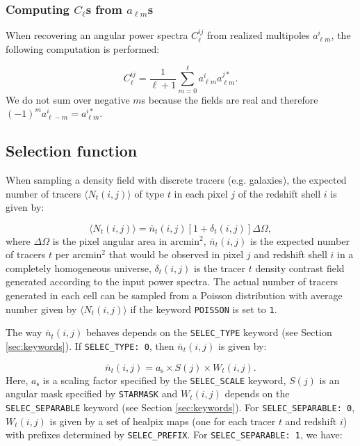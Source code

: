 \documentclass[12pt]{book} %
\begin{document}
\subsubsection{Computing $C_\ell$s from $a_{\ell m}$s}

When recovering an angular power spectra $C_\ell^{ij}$ from realized multipoles $a_{\ell m}^{i}$, 
the following computation is performed:

\begin{equation}
C_\ell^{ij} = \frac{1}{\ell+1}\sum_{m=0}^\ell a_{\ell m}^{i}a_{\ell m}^{j*}.
\label{eq:recov-cl}
\end{equation}
We do not sum over negative $m$s because the fields are real and therefore 
$(-1)^m a_{\ell -m}^{i} = a_{\ell m}^{i*}$.

\subsection{Selection function}

When sampling a density field with discrete tracers (e.g. galaxies), the expected number 
of tracers $\langle N_t(i,j) \rangle$ of type $t$ in each pixel $j$ of the redshift shell $i$ 
is given by:

\begin{equation}
\langle N_t(i,j) \rangle = \bar{n}_t(i,j)[1+\delta_t(i,j)]\Delta\Omega,
\label{eq:tracer-number}
\end{equation}
where $\Delta\Omega$ is the pixel angular area in $\mathrm{arcmin}^2$, $\bar{n}_t(i,j)$ 
is the expected number of tracers $t$ per $\mathrm{arcmin}^2$ that would be observed 
in pixel $j$ and redshift shell $i$ in a completely homogeneous universe, 
$\delta_t(i,j)$ is the tracer $t$ density contrast field generated according 
to the input power spectra. The actual number of tracers generated in each cell can be sampled 
from a Poisson distribution with average number given by $\langle N_t(i,j) \rangle$ if the keyword 
{\tt POISSON} is set to {\tt 1}.

The way $\bar{n}_t(i,j)$ behaves depends on the {\tt SELEC\_TYPE} keyword (see Section \ref{sec:keywords}). 
If {\tt SELEC\_TYPE: 0}, then $\bar{n}_t(i,j)$ is given by:

\begin{equation}
\bar{n}_t(i,j) = a_{\mathrm{s}} \times S(j) \times W_t(i,j).  
\label{eq:selection-function} 
\end{equation}
Here, $a_{\mathrm{s}}$ is a scaling factor specified by the {\tt SELEC\_SCALE} keyword, 
$S(j)$ is an angular mask specified by {\tt STARMASK} and $W_t(i,j)$ depends on the 
{\tt SELEC\_SEPARABLE} keyword (see Section \ref{sec:keywords}). For 
{\tt SELEC\_SEPARABLE: 0}, $W_t(i,j)$ is given by a set of {\sc healpix} maps (one for 
each tracer $t$ and redshift $i$) with prefixes determined by {\tt SELEC\_PREFIX}. For 
{\tt SELEC\_SEPARABLE: 1}, we have:
\end{document}
